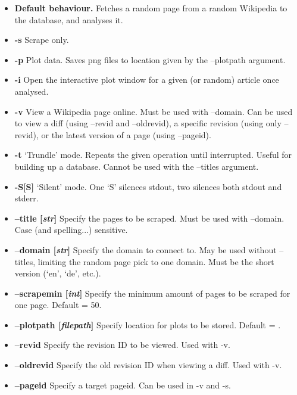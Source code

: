 \begin{itemize}[label={}]
  \item \textbf{Default behaviour.} Fetches a random page from a
    random Wikipedia to the database, and analyses it.
  \item \textbf{-s} Scrape only. 
  \item \textbf{-p} Plot data. Saves png files to location given by
    the --plotpath argument.
  \item \textbf{-i} Open the interactive plot window for a given (or
    random) article once analysed.
  \item \textbf{-v} View a Wikipedia page online. Must be used with
    --domain. Can be used to view a diff (using --revid and
    --oldrevid), a specific revision (using only --revid), or the
    latest version of a page (using --pageid).
  \item \textbf{-t} `Trundle' mode. Repeats the given operation until
    interrupted. Useful for building up a database. Cannot be used
    with the --titles argument.
  \item \textbf{-S[S]} `Silent' mode. One `S' silences stdout, two
    silences both stdout and stderr.
  \item \textbf{--title [\textit{str}]} Specify the
    pages to be scraped. Must be used with --domain. Case (and
    spelling...)  sensitive.
  \item \textbf{--domain [\textit{str}]} Specify the domain to connect
    to. May be used without --titles, limiting the random page pick to
    one domain. Must be the short version (`en', `de', etc.).
  \item \textbf{--scrapemin [\textit{int}]} Specify the minimum amount of
    pages to be scraped for one page. Default = 50.
  \item \textbf{--plotpath [\textit{filepath}]} Specify location for
    plots to be stored. Default = .
  \item \textbf{--revid} Specify the revision ID to be viewed. Used
    with -v.
  \item \textbf{--oldrevid} Specify the old revision ID when viewing a
    diff. Used with -v.
  \item \textbf{--pageid} Specify a target pageid. Can be used in -v
    and -s.
\end{itemize}
